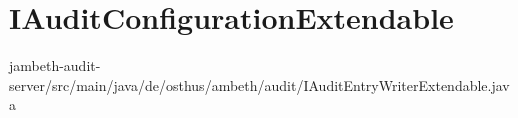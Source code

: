\section{IAuditConfigurationExtendable}
\label{extendable:IAuditConfigurationExtendable}
	{jambeth-audit-server/src/main/java/de/osthus/ambeth/audit/IAuditEntryWriterExtendable.java}


